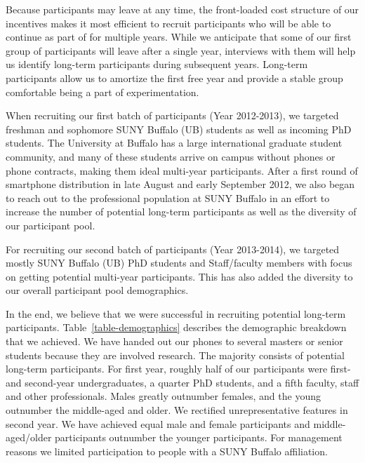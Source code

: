 Because participants may leave at any time, the front-loaded cost structure
of our incentives makes it most efficient to recruit participants who will be
able to continue as part of \PhoneLab{} for multiple years. While we
anticipate that some of our first group of participants will leave after a
single year, interviews with them will help us identify long-term
participants during subsequent years. Long-term participants allow us to
amortize the first free year and provide a stable group comfortable being a
part of \PhoneLab{} experimentation.

When recruiting our first batch of participants (Year 2012-2013), we targeted freshman
and sophomore SUNY Buffalo (UB) students as well as incoming PhD students. The
University at Buffalo has a large international graduate student community, and
many of these students arrive on campus without phones or phone contracts,
making them ideal multi-year \PhoneLab{} participants. After a first round of
smartphone distribution in late August and early September 2012, we also began
to reach out to the professional population at SUNY Buffalo in an effort to
increase the number of potential long-term participants as well as the diversity
of our participant pool.

For recruiting our second batch of participants (Year 2013-2014), we targeted mostly 
SUNY Buffalo (UB) PhD students and Staff/faculty members with focus on getting potential 
multi-year \PhoneLab{} participants. This has also added the diversity to our overall participant pool demographics.



In the end, we believe that we were successful in recruiting potential
long-term participants. Table~\ref{table-demographics} describes the
demographic breakdown that we achieved. We have handed out our phones to
several masters or senior students because they are involved \PhoneLab{}
research. The majority consists of potential long-term participants. 
For first year, roughly half of our participants were first- and second-year undergraduates, 
a quarter PhD students, and a fifth faculty, staff and other professionals. Males greatly outnumber females, 
and the young outnumber the middle-aged and older.  
We rectified unrepresentative features in second year. We have achieved equal male and female participants
and middle-aged/older participants outnumber the younger participants. 
For management reasons we limited participation to people with a SUNY Buffalo
affiliation.

